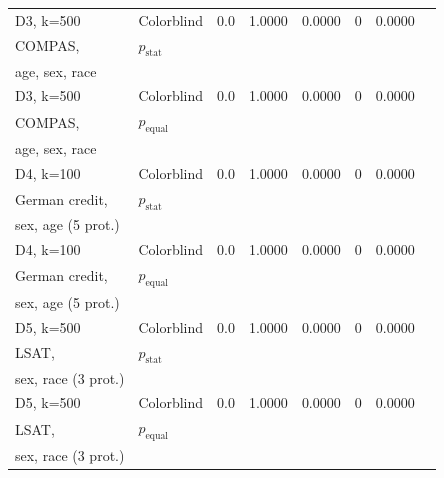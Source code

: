 \begin{table}[t]
{\begin{tabular}{llcccccc}
			D3, k=500 & Colorblind & 0.0 & 1.0000 & 0.0000 & 0 & 0.0000 \\
			COMPAS, & \algoFAIR  $p_{\text{stat}}$ &  & \textbf{} & \textbf{} & \textbf{} & \textbf{} \\
			age, sex, race & \citeauthor{zehlike2020matching} &  &  &  &  &  \\ \midrule
			
			D3, k=500 & Colorblind & 0.0 & 1.0000 & 0.0000 & 0 & 0.0000 \\
			COMPAS, & \algoFAIR  $p_{\text{equal}}$ &  & \textbf{} & \textbf{} & \textbf{} & \textbf{} \\
			age, sex, race & \citeauthor{zehlike2020matching} &  &  &  &  &  \\ \midrule
			\midrule
			
			D4, k=100  & Colorblind & 0.0 & 1.0000 & 0.0000 & 0 & 0.0000 \\
			German credit, & \algoFAIR $p_{\text{stat}}$ &  & \textbf{} & \textbf{} & \textbf{} & \textbf{} \\
			sex, age (5 prot.) & \citeauthor{zehlike2020matching} &  &  &  &  &  \\ \midrule
			
			D4, k=100  & Colorblind & 0.0 & 1.0000 & 0.0000 & 0 & 0.0000 \\
			German credit, & \algoFAIR $p_{\text{equal}}$ &  & \textbf{} & \textbf{} & \textbf{} & \textbf{} \\
			sex, age (5 prot.) & \citeauthor{zehlike2020matching} &  &  &  &  &  \\ \midrule
			\midrule
			
			D5, k=500  & Colorblind & 0.0 & 1.0000 & 0.0000 & 0 & 0.0000 \\
			LSAT,& \algoFAIR $p_{\text{stat}}$ &  & \textbf{} & \textbf{} & \textbf{} & \textbf{} \\
			sex, race (3 prot.) & \citeauthor{zehlike2020matching} &  &  &  &  & \textbf{} \\ \midrule
			
			D5, k=500  & Colorblind & 0.0 & 1.0000 & 0.0000 & 0 & 0.0000 \\
			LSAT,& \algoFAIR $p_{\text{equal}}$ &  & \textbf{} & \textbf{} & \textbf{} & \textbf{} \\
			sex, race (3 prot.) & \citeauthor{zehlike2020matching} &  &  &  &  & \textbf{} \\			
			\bottomrule
		\end{tabular}
	}
	\vspace{-3mm}
\end{table}

